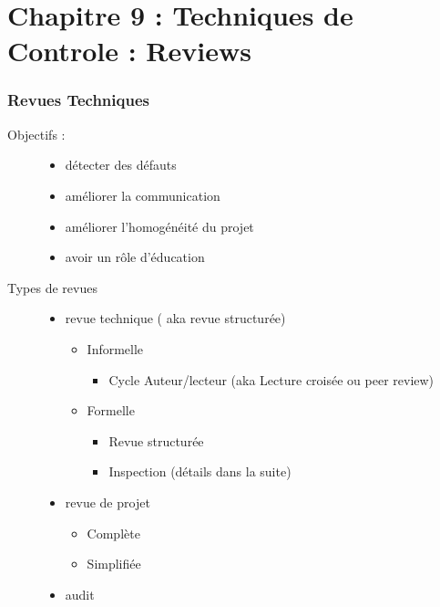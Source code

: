 \part{Chapitre 9 : Techniques de Controle : Reviews}

\section{Revues Techniques}

\begin{description}
\item[Objectifs :]
	\begin{itemize}
	\item détecter des défauts
	\item améliorer la communication
	\item améliorer l'homogénéité du projet
	\item avoir un rôle d'éducation
	\end{itemize}

\item[Types de revues]
	\begin{itemize}

	\item revue technique ( aka revue structurée)
		\begin{itemize}

		\item Informelle
			\begin{itemize}

			\item Cycle Auteur/lecteur (aka Lecture croisée ou peer review)
			\end{itemize}

		\item Formelle
			\begin{itemize}

				\item Revue structurée
				\item Inspection (détails dans la suite)

			\end{itemize}
		\end{itemize}

	\item revue de projet
		\begin{itemize}

		\item Complète
		\item Simplifiée

		\end{itemize}

	\item audit

	\end{itemize}

\end{description}


